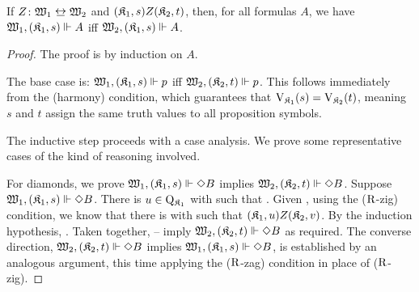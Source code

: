 \begin{theorem}[Invariance]
	If $Z \colon \wmodel_1 \bisim \wmodel_2$ and ${\pair {\kmodel_1} s} Z {\pair {\kmodel_2} t}$, then, for all formulas $A$, we have $\xforces {\wmodel_1} {\pair {\kmodel_1} s} A$ iff $\xforces {\wmodel_2} {\pair {\kmodel_1} s} A$.
\end{theorem}
\begin{proof}
    \setcounter{ieqnnum}{0}
    The proof is by induction on $A$.

    \medskip
    \noindent
    The base case is: $\xforces {\wmodel_1} {\pair {\kmodel_1} s} p$ iff $\xforces {\wmodel_2} {\pair {\kmodel_2} t} p$.
	This follows immediately from the (harmony) condition, which guarantees that $\Vkm[1](s) = \Vkm[2](t)$, meaning $s$ and $t$ assign the same truth values to all proposition symbols.

    \medskip
    \noindent
    The inductive step proceeds with a case analysis.
    We prove some representative cases of the kind of reasoning involved.

	\medskip
    \noindent
    For diamonds, we prove $\xforces {\wmodel_1} {\pair {\kmodel_1} s} {\Diamond B}$ implies $\xforces {\wmodel_2} {\pair {\kmodel_2} t} {\Diamond B}$.
    Suppose $\xforces {\wmodel_1} {\pair {\kmodel_1} s} {\Diamond B}$.
    There is $u \in \Wkm[1]$ with  such that .
	Given , using the ($\R$-zig) condition, we know that there is  with  such that ${\pair {\kmodel_1} u} Z {\pair {\kmodel_2} v}$.
	By the induction hypothesis, .
	Taken together, -- imply $\xforces {\wmodel_2} {\pair {\kmodel_2} t} {\Diamond B}$ as required.
	The converse direction, $\xforces{\wmodel_2}{\pair{\kmodel_2}{t}}{\Diamond B}$ implies $\xforces{\wmodel_1}{\pair{\kmodel_1}{s}}{\Diamond B}$, is established by an analogous argument, this time applying the ($\R$-zag) condition in place of ($\R$-zig).


\end{proof}
